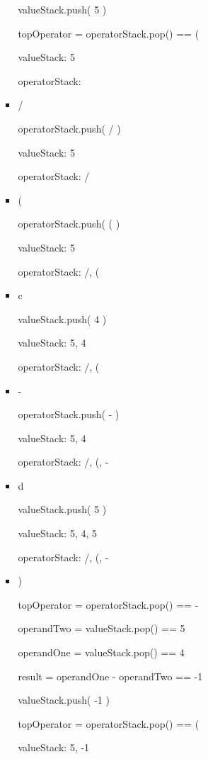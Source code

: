 \documentclass[10pt]{article}
\begin{document}
\begin{enumerate}
\begin{itemize}
\begin{itemize}
							valueStack.push( 5 )
							
							topOperator = operatorStack.pop() == (
							
							valueStack: 5
							
							operatorStack:
						
						\item /
							
							operatorStack.push( / )
							
							valueStack: 5
							
							operatorStack: /
						
						\item (
							
							operatorStack.push( ( )
							
							valueStack: 5
							
							operatorStack: /, (
						
						\item c
							
							valueStack.push( 4 )
							
							valueStack: 5, 4
							
							operatorStack: /, (
						
						\item -
							
							operatorStack.push( - )
							
							valueStack: 5, 4
							
							operatorStack: /, (, -
						
						\item d
							
							valueStack.push( 5 )
							
							valueStack: 5, 4, 5
							
							operatorStack: /, (, -
						
						\item )
							
							topOperator = operatorStack.pop() == -
							
							operandTwo = valueStack.pop() == 5
							
							operandOne = valueStack.pop() == 4
							
							result = operandOne - operandTwo == -1
							
							valueStack.push( -1 )
							
							topOperator = operatorStack.pop() == (
							
							valueStack: 5, -1
							

\end{itemize}
\end{itemize}
\end{enumerate}
\end{document}
